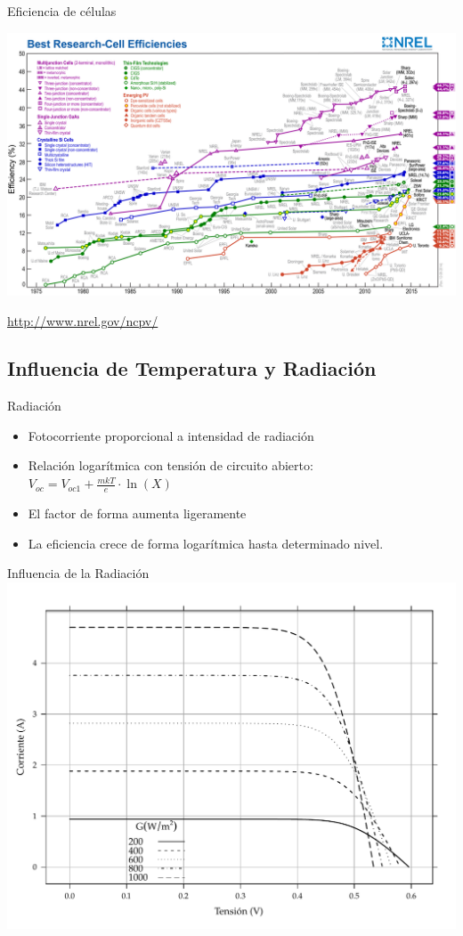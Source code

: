 \documentclass[xcolor={usenames,svgnames,dvipsnames}]{beamer}
\begin{document}
\begin{frame}[plain,label=sec-3-1-6]{Eficiencia de células}

\includegraphics[width=1.2\textwidth]{../figs/efficiency_chart_nrel.jpg}

\url{http://www.nrel.gov/ncpv/}
\end{frame}

\subsection{Influencia de Temperatura y Radiación}
\label{sec-3-2}

\begin{frame}[label=sec-3-2-1]{Radiación}
\begin{itemize}
\item \alert{Fotocorriente proporcional a intensidad de radiación}

\item Relación logarítmica con tensión de circuito abierto:
$V_{oc}=V_{oc1}+\frac{mkT}{e}\cdot\ln(X)$

\item El factor de forma aumenta ligeramente

\item La eficiencia crece de forma logarítmica hasta determinado nivel.
\end{itemize}
\end{frame}

\begin{frame}[label=sec-3-2-2]{Influencia de la Radiación}
\includegraphics[width=.9\linewidth]{../figs/CurvaIV_Ta20.pdf}
\end{frame}
\end{document}
